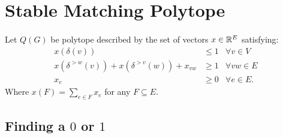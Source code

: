 \documentclass[letterpaper,12pt,oneside,onecolumn]{article}
\begin{document}
\section{Stable Matching Polytope}
\paragraph{}
Let $Q(G)$ be polytope described by the set of vectors $x \in \mathbb{R}^E$ satisfying:
\begin{align*}
x(\delta(v)) &\leq 1 &\forall v \in V\\
x(\delta^{>w}(v))+ x(\delta^{>v}(w)) + x_{vw} &\geq 1 &\forall vw \in E \\
x_e &\geq 0 &\forall e \in E.
\end{align*}
Where $x(F) = \sum_{e \in F} x_e$ for any $F \subseteq E$.
\subsection{Finding a $0$ or $1$}
\end{document}
